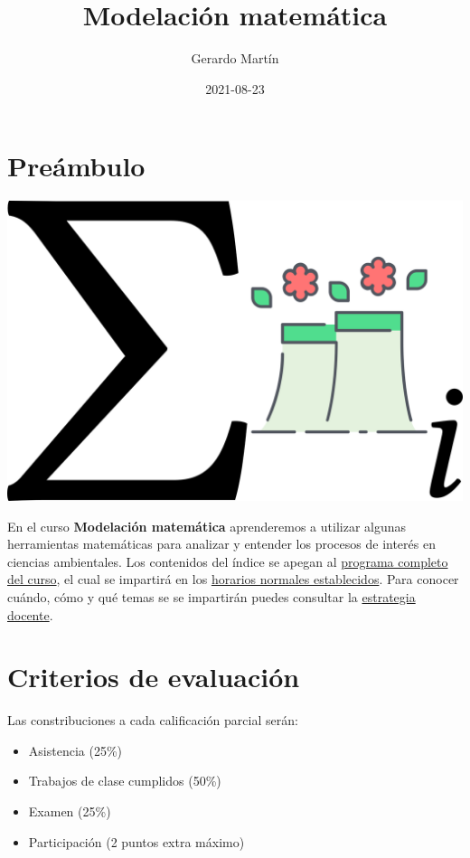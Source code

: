 \documentclass[
]{book}
\title{Modelación matemática}
\author{Gerardo Martín}
\date{2021-08-23}
\providecommand{\tightlist}{%
  \setlength{\itemsep}{0pt}\setlength{\parskip}{0pt}}
\begin{document}
\maketitle

{
\setcounter{tocdepth}{1}
\tableofcontents
}
\hypertarget{preuxe1mbulo}{%
\chapter{Preámbulo}\label{preuxe1mbulo}}

\begin{center}\includegraphics[width=20.83in]{logo} \end{center}

En el curso \textbf{Modelación matemática} aprenderemos a utilizar algunas herramientas matemáticas para analizar y entender los procesos de interés en ciencias ambientales. Los contenidos del índice se apegan al \href{Programa-curso.pdf}{programa completo del curso}, el cual se impartirá en los \href{Horario.pdf}{horarios normales establecidos}. Para conocer cuándo, cómo y qué temas se se impartirán puedes consultar la \href{Estrategia-docente.pdf}{estrategia docente}.

\hypertarget{criterios-de-evaluaciuxf3n}{%
\chapter{Criterios de evaluación}\label{criterios-de-evaluaciuxf3n}}

Las constribuciones a cada calificación parcial serán:

\begin{itemize}
\tightlist
\item
  Asistencia (25\%)
\item
  Trabajos de clase cumplidos (50\%)
\item
  Examen (25\%)
\item
  Participación (2 puntos extra máximo)
\end{itemize}
\end{document}

